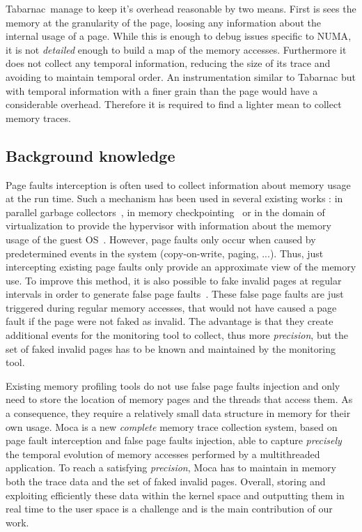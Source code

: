 \gls{Tabarnac} manage to keep it's overhead reasonable by two means.
First is sees the memory at the granularity of the page, loosing any information about the internal usage of a page.
While this is enough to debug issues specific to \gls{NUMA}, it is not \emph{detailed} enough to build a map of the memory accesses.
Furthermore it does not collect any temporal information, reducing the size of its trace and avoiding to maintain temporal order.
An instrumentation similar to \gls{Tabarnac} but with temporal information with a finer grain than the page would have a considerable overhead.
Therefore it is required to find a lighter mean to collect memory traces.

\subsection{Background knowledge}

Page faults interception is often used to collect information about memory usage at the run time.
Such a mechanism has been used in several existing works : in parallel garbage collectors~\cite{Boehm91Mostly}, in memory checkpointing~\cite{Heo05Spaceefficient} or in the domain of virtualization to provide the hypervisor with information about the memory usage of the guest \gls{OS}~\cite{Jones06Geiger}.
However, page faults only occur when caused by predetermined events in the system (copy-on-write, paging, ...).
Thus, just intercepting existing page faults only provide an approximate view of the memory use.
To improve this method, it is also possible to fake invalid pages at regular intervals in order to generate false page faults~\cite{Bae12Dynamic,Diener13CommunicationBased}.
These false page faults are just triggered during regular memory accesses, that would not have caused a page fault if the page were not faked as invalid.
The advantage is that they create additional events for the monitoring tool to collect, thus more \emph{precision}, but the set of faked invalid pages has to be known and maintained by the monitoring tool.

Existing memory profiling tools do not use false page faults injection and only need to store the location of memory pages and the threads that access them.
As a consequence, they require a relatively small data structure in memory for their own usage.
\gls{Moca} is a new \emph{complete} memory trace collection system, based on page fault interception and false page faults injection, able to capture \emph{precisely} the temporal evolution of memory accesses performed by a multithreaded application.
To reach a satisfying \emph{precision}, \gls{Moca} has to maintain in memory both the trace data and the set of faked invalid pages.
Overall, storing and exploiting efficiently these data within the kernel space and outputting them in real time to the user space is a challenge and is the main contribution of our work.

